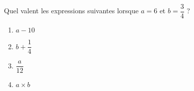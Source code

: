 
\begin{exercice}\label{exo2smath-0155}

    Quel valent les expressions suivantes lorsque \( a=6\) et \( b=\dfrac{ 3 }{ 4 }\) ?
    \begin{multicols}{2}
    \begin{enumerate}
        \item
            \( a-10\)
        \item
            \( b+\dfrac{ 1 }{ 4 }\)
        \item
            \( \dfrac{ a }{ 12 }\)
        \item
            \( a\times b\)
    \end{enumerate}
    \end{multicols}

\end{exercice}
